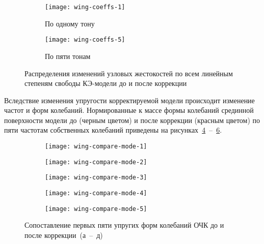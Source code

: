 \begin{figure}[!htb]
	\centering
	\begin{subfigure}[t]{\sfWing}
		\centering
		\texttt{[image: wing-coeffs-1]}
		\caption{По одному тону} \label{subfig:wing-coeffs-1} 
	\end{subfigure}
	\hfill
	\begin{subfigure}[t]{\sfWing}
		\centering
		\texttt{[image: wing-coeffs-5]}
		\caption{По пяти тонам} \label{subfig:wing-coeffs-5}
	\end{subfigure}	
	\caption{Распределения изменений узловых жестокостей по всем линейным степеням свободы КЭ-модели до и после коррекции}
\end{figure}

Вследствие изменения упругости корректируемой модели происходит изменение частот и форм колебаний. Нормированные к массе формы колебаний срединной поверхности модели до (черным цветом) и после коррекции (красным цветом) по пяти частотам собственных колебаний приведены на рисунках~\ref{subfig:wing-compare-mode-1}~--~\ref{subfig:wing-compare-mode-5}.

\begin{figure}[!htb]
	\centering
	\begin{subfigure}[t]{\sfWing}
		\centering
		\texttt{[image: wing-compare-mode-1]}
		\caption{} \label{subfig:wing-compare-mode-1} 
	\end{subfigure}
	\hfill
	\begin{subfigure}[t]{\sfWing}
		\centering
		\texttt{[image: wing-compare-mode-2]}
		\caption{} 
	\end{subfigure}	
	\begin{subfigure}[t]{\sfWing}
		\centering
		\texttt{[image: wing-compare-mode-3]}
		\caption{} 
	\end{subfigure}	
	\hfill
	\begin{subfigure}[t]{\sfWing}
		\centering
		\texttt{[image: wing-compare-mode-4]}
		\caption{} 
	\end{subfigure}	
	\begin{subfigure}[t]{\sfWing}
		\centering
		\texttt{[image: wing-compare-mode-5]}
		\caption{} \label{subfig:wing-compare-mode-5} 
	\end{subfigure}	
	\caption{Сопоставление первых пяти упругих форм колебаний ОЧК до и после коррекции~(а~--~д)}
\end{figure}

